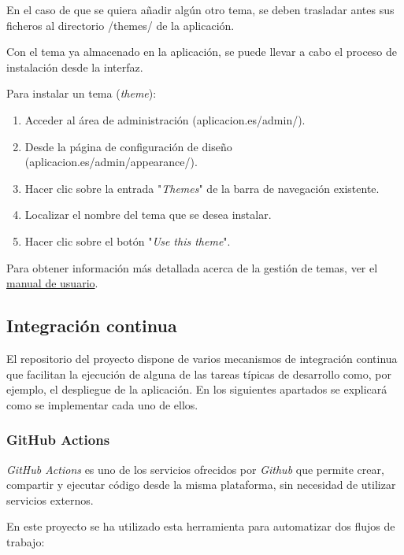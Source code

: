 \documentclass[
]{article}
\providecommand{\tightlist}{%
  \setlength{\itemsep}{0pt}\setlength{\parskip}{0pt}}
\begin{document}
En el caso de que se quiera añadir algún otro tema, se deben trasladar
antes sus ficheros al directorio {/themes/} de la aplicación.

Con el tema ya almacenado en la aplicación, se puede llevar a cabo el
proceso de instalación desde la interfaz.

Para instalar un tema (\emph{theme}):

\begin{enumerate}
\def\labelenumi{\arabic{enumi}.}
\tightlist
\item
  Acceder al área de administración ({aplicacion.es/admin/}).
\item
  Desde la página de configuración de diseño
  ({aplicacion.es/admin/appearance/}).
\item
  Hacer clic sobre la entrada "\emph{Themes}" de la barra de navegación
  existente.
\item
  Localizar el nombre del tema que se desea instalar.
\item
  Hacer clic sobre el botón "\emph{Use this theme}".
\end{enumerate}

Para obtener información más detallada acerca de la gestión de temas,
ver el
\href{https://tfg-ceniehariadne.readthedocs.io/es/latest/anexos/E_Manual_usuario.html\#manual-de-usuario}{manual
de usuario}.

\hypertarget{integraciuxf3n-continua}{%
\subsection{Integración continua}\label{integraciuxf3n-continua}}

El repositorio del proyecto dispone de varios mecanismos de integración
continua que facilitan la ejecución de alguna de las tareas típicas de
desarrollo como, por ejemplo, el despliegue de la aplicación. En los
siguientes apartados se explicará como se implementar cada uno de ellos.

\hypertarget{github-actions}{%
\subsubsection{GitHub Actions}\label{github-actions}}

\emph{GitHub Actions} es uno de los servicios ofrecidos por
\emph{Github} que permite crear, compartir y ejecutar código desde la
misma plataforma, sin necesidad de utilizar servicios externos.

En este proyecto se ha utilizado esta herramienta para automatizar dos
flujos de trabajo:
\end{document}
